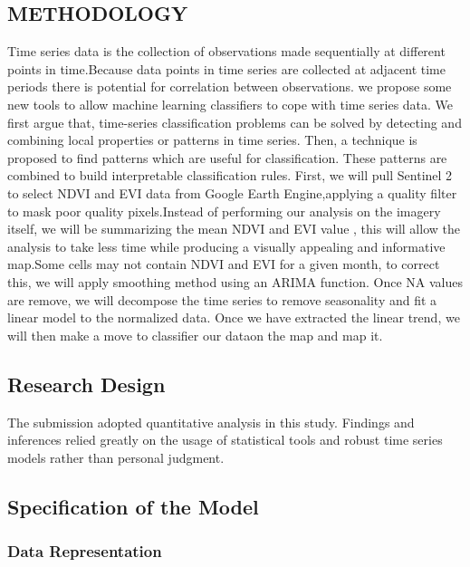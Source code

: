 \documentclass[10pt]{report}
\newenvironment{Shaded}{\begin{snugshade}}{\end{snugshade}}
\begin{document}
\begin{flushleft}
		\section{METHODOLOGY}
		Time series data is the collection of observations made sequentially at different points in time.Because data points in time series are collected at adjacent time periods there is potential for correlation between observations. we propose some new tools to allow machine learning classifiers to cope with time series data. We first argue that, time-series classification problems can be solved by detecting and combining local properties or patterns in time series. Then, a technique is proposed to find patterns which are useful for classification. These patterns are combined to build interpretable classification rules.
		First, we will pull Sentinel 2 to select NDVI and EVI data from Google Earth Engine,applying a quality filter to mask poor quality pixels.Instead of performing our analysis on the imagery itself, we will be summarizing the mean NDVI and EVI value , this will allow the analysis to take less time while producing a visually appealing and informative map.Some cells may not contain NDVI and EVI for a given month, to correct this, we will apply smoothing method using an ARIMA function.
		Once NA values are remove, we will decompose the time series to remove seasonality and fit a linear model to the normalized data.
		Once we have extracted the linear trend, we will then make a move to classifier our dataon the map and map it.
		
		\subsection{Research Design}
		The submission adopted quantitative analysis in this study. Findings and inferences relied greatly on the usage of statistical tools and robust time series models rather than personal judgment.
		\subsection{Specification of the Model}
		\subsubsection{Data Representation}

\end{flushleft}
\end{document}
